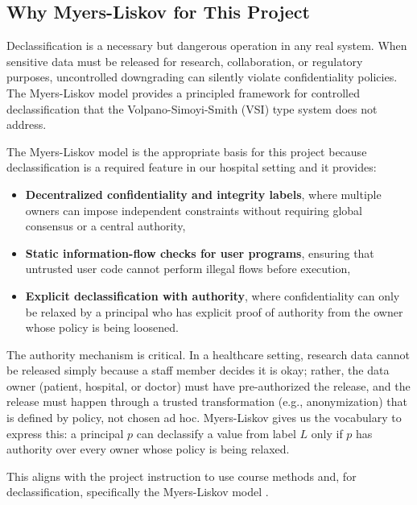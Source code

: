 \subsection{Why Myers-Liskov for This Project}

Declassification is a necessary but dangerous operation in any real system. When sensitive data must be released for research, collaboration, or regulatory purposes, uncontrolled downgrading can silently violate confidentiality policies. The Myers-Liskov model provides a principled framework for controlled declassification that the Volpano-Simoyi-Smith (VSI) type system does not address.

The Myers-Liskov model is the appropriate basis for this project because declassification is a required feature in our hospital setting and it provides:
\begin{itemize}
    \item \textbf{Decentralized confidentiality and integrity labels}, where multiple owners can impose independent constraints without requiring global consensus or a central authority,
    \item \textbf{Static information-flow checks for user programs}, ensuring that untrusted user code cannot perform illegal flows before execution,
    \item \textbf{Explicit declassification with authority}, where confidentiality can only be relaxed by a principal who has explicit proof of authority from the owner whose policy is being loosened.
\end{itemize}

The authority mechanism is critical. In a healthcare setting, research data cannot be released simply because a staff member decides it is okay; rather, the data owner (patient, hospital, or doctor) must have pre-authorized the release, and the release must happen through a trusted transformation (e.g., anonymization) that is defined by policy, not chosen ad hoc. Myers-Liskov gives us the vocabulary to express this: a principal $p$ can declassify a value from label $L$ only if $p$ has authority over every owner whose policy is being relaxed.

This aligns with the project instruction to use course methods and, for declassification, specifically the Myers-Liskov model \cite{ProjectDescription}.

